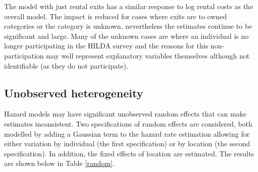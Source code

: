 \documentclass[12pt]{article}
\begin{document}
The model with just rental exits has a similar response to log rental costs as the overall model. The impact is reduced for cases where exits are to owned categories or the category is unknown, nevertheless the estimates continue to be significant and large. Many of the unknown cases are where an individual is no longer participating in the HILDA survey and the reasons for this non-participation may well represent explanatory variables themselves although not identifiable (as they do not participate).

\subsection{Unobserved heterogeneity}

Hazard models may have significant unobserved random effects that can make estimates inconsistent. Two specifications of random effects are considered, both modelled by adding a Gaussian term to the hazard rate estimation allowing for either variation by individual (the first specification) or by location (the second specification). In addition, the fixed effects of location are estimated. The results are shown below in Table \ref{random}.
\end{document}
